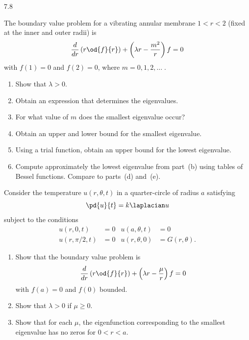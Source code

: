 \begin{exercises}{7.8}

\item The boundary value problem for a vibrating annular membrane $1 < r < 2$ (fixed at the inner and outer radii) is
\[
\frac{d}{d r}\left(r\od{f}{r}\right) + \left(\lambda r - \frac{m^2}{r}\right)f = 0
\]
with $f(1) = 0$ and $f(2) = 0$, where $m = 0, 1, 2, \ldots\;$.

\begin{enumerate}
\item[(a)] Show that $\lambda > 0$.

\item[\starred(b)] Obtain an expression that determines the eigenvalues.

\item[(c)] For what value of $m$ does the smallest eigenvalue occur?

\item[\starred(d)] Obtain an upper and lower bound for the smallest eigenvalue.

\item[(e)] Using a trial function, obtain an upper bound for the lowest eigenvalue.

\item[(f)] Compute approximately the lowest eigenvalue from part~(b) using tables of Bessel functions.  Compare to parts~(d) and~(e).
\end{enumerate}

\item Consider the temperature $u(r,\theta,t)$ in a quarter-circle of radius $a$ satisfying
\[
\pd{u}{t} = k\laplacian u
\]
subject to the conditions
\[
\begin{aligned}
u(r,0,t) &= 0 & u(a,\theta,t) &= 0 \\
u(r,\pi/2,t) &= 0 & u(r,\theta,0) &= G(r,\theta).
\end{aligned}
\]

\begin{enumerate}
\item[(a)] Show that the boundary value problem is
\[
\frac{d}{d r}\left(r\od{f}{r}\right) + \left(\lambda r - \frac{\mu}{r}\right)f = 0
\]
with $f(a) = 0$ and $f(0)$ bounded.

\item[(b)] Show that $\lambda > 0$ if $\mu \geq 0$.

\item[(c)] Show that for each $\mu$, the eigenfunction corresponding to the smallest eigenvalue has no zeros for $0 < r < a$.


\end{enumerate}
\end{exercises}
